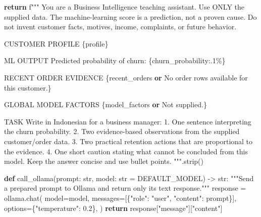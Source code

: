 \documentclass[
  indonesian,
  letterpaper,
  DIV=11,
  numbers=noendperiod]{scrreprt}
\newenvironment{Shaded}{\begin{snugshade}}{\end{snugshade}}
\newcommand{\BuiltInTok}[1]{\textcolor[rgb]{0.00,0.23,0.31}{#1}}
\newcommand{\CommentTok}[1]{\textcolor[rgb]{0.37,0.37,0.37}{#1}}
\newcommand{\ControlFlowTok}[1]{\textcolor[rgb]{0.00,0.23,0.31}{\textbf{#1}}}
\newcommand{\FloatTok}[1]{\textcolor[rgb]{0.68,0.00,0.00}{#1}}
\newcommand{\KeywordTok}[1]{\textcolor[rgb]{0.00,0.23,0.31}{\textbf{#1}}}
\newcommand{\NormalTok}[1]{\textcolor[rgb]{0.00,0.23,0.31}{#1}}
\newcommand{\OperatorTok}[1]{\textcolor[rgb]{0.37,0.37,0.37}{#1}}
\newcommand{\SpecialCharTok}[1]{\textcolor[rgb]{0.37,0.37,0.37}{#1}}
\newcommand{\SpecialStringTok}[1]{\textcolor[rgb]{0.13,0.47,0.30}{#1}}
\newcommand{\StringTok}[1]{\textcolor[rgb]{0.13,0.47,0.30}{#1}}
\begin{document}
\begin{Shaded}
\begin{Highlighting}[]
    \ControlFlowTok{return} \SpecialStringTok{f"""}
\SpecialStringTok{You are a Business Intelligence teaching assistant.}
\SpecialStringTok{Use ONLY the supplied data. The machine{-}learning score is a prediction, not a proven cause.}
\SpecialStringTok{Do not invent customer facts, motives, income, complaints, or future behavior.}

\SpecialStringTok{CUSTOMER PROFILE}
\SpecialCharTok{\{}\NormalTok{profile}\SpecialCharTok{\}}

\SpecialStringTok{ML OUTPUT}
\SpecialStringTok{Predicted probability of churn: }\SpecialCharTok{\{}\NormalTok{churn\_probability}\SpecialCharTok{:.1\%\}}

\SpecialStringTok{RECENT ORDER EVIDENCE}
\SpecialCharTok{\{}\NormalTok{recent\_orders }\KeywordTok{or} \StringTok{\textquotesingle{}No order rows available for this customer.\textquotesingle{}}\SpecialCharTok{\}}

\SpecialStringTok{GLOBAL MODEL FACTORS}
\SpecialCharTok{\{}\NormalTok{model\_factors }\KeywordTok{or} \StringTok{\textquotesingle{}Not supplied.\textquotesingle{}}\SpecialCharTok{\}}

\SpecialStringTok{TASK}
\SpecialStringTok{Write in Indonesian for a business manager:}
\SpecialStringTok{1. One sentence interpreting the churn probability.}
\SpecialStringTok{2. Two evidence{-}based observations from the supplied customer/order data.}
\SpecialStringTok{3. Two practical retention actions that are proportional to the evidence.}
\SpecialStringTok{4. One short caution stating what cannot be concluded from this model.}
\SpecialStringTok{Keep the answer concise and use bullet points.}
\SpecialStringTok{"""}\NormalTok{.strip()}


\KeywordTok{def}\NormalTok{ call\_ollama(prompt: }\BuiltInTok{str}\NormalTok{, model: }\BuiltInTok{str} \OperatorTok{=}\NormalTok{ DEFAULT\_MODEL) }\OperatorTok{{-}\textgreater{}} \BuiltInTok{str}\NormalTok{:}
    \CommentTok{"""Send a prepared prompt to Ollama and return only its text response."""}
\NormalTok{    response }\OperatorTok{=}\NormalTok{ ollama.chat(}
\NormalTok{        model}\OperatorTok{=}\NormalTok{model,}
\NormalTok{        messages}\OperatorTok{=}\NormalTok{[\{}\StringTok{"role"}\NormalTok{: }\StringTok{"user"}\NormalTok{, }\StringTok{"content"}\NormalTok{: prompt\}],}
\NormalTok{        options}\OperatorTok{=}\NormalTok{\{}\StringTok{"temperature"}\NormalTok{: }\FloatTok{0.2}\NormalTok{\},}
\NormalTok{    )}
    \ControlFlowTok{return}\NormalTok{ response[}\StringTok{"message"}\NormalTok{][}\StringTok{"content"}\NormalTok{]}



\end{Highlighting}
\end{Shaded}
\end{document}
